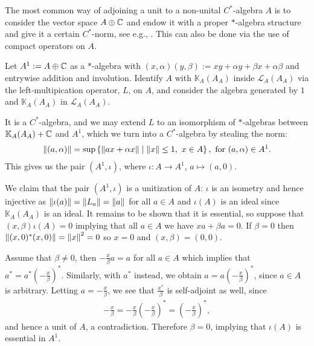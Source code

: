 The most common way of adjoining a unit to a non-unital $C^*$-algebra $A$ is to consider the vector space $A\oplus \mathbb{C}$ and endow it with a proper $*$-algebra structure and give it a certain $C^*$-norm, see e.g., \cite[Theorem 15.1]{zhu}. This can also be done via the use of compact operators on $A$.
\begin{example}
	Let $A^1 := A \oplus \mathbb{C}$ as a $*$-algebra with $(x,\alpha)(y,\beta):=xy+\alpha y + \beta x + \alpha \beta$ and entrywise addition and involution. Identify $A$ with $\mathbb{K}_A(A_A)$ inside $\mathcal{L}_A(A_A)$ via the left-multipication operator, $L$, on $A$, and consider the algebra generated by $1$ and $\mathbb{K}_A(A_A)$ in $\mathcal{L}_A(A_A)$. 
	
	It is a $C^*$-algebra, and we may extend $L$ to an isomorphism of $*$-algebras between $\mathbb{K}_A(A_A)+\mathbb{C}$ and $A^1$, which we turn into a $C^*$-algebra by stealing the norm:
	\begin{align*}
		\left\lVert (a,\alpha)\right\rVert = \sup\left\{ \left\lVert ax + \alpha x \right\rVert \mid \left\lVert x \right\rVert \leq 1, \ x \in A \right\}, \text{ for } (a,\alpha) \in A^1.
	\end{align*}
	This gives us the pair $(A^1,\iota)$, where $\iota \colon A \to A^1$, $a \mapsto (a,0)$.
	
	We claim that the pair $(A^1,\iota)$ is a unitization of $A$: $\iota$ is an isometry and hence injective as $\left\lVert \iota(a)\right\rVert = \left\lVert L_a \right\rVert = \left\lVert a \right\rVert$ for all $a \in A$ and $\iota(A)$ is an ideal since $\mathbb{K}_{A}(A_A)$ is an ideal. It remains to be shown that it is essential, so suppose that $(x,\beta) \iota(A)=0$ implying that all $a \in A$ we have $xa+\beta a = 0$. If $\beta = 0$ then $\left\lVert(x,0)^*(x,0)\right\rVert = \left\lVert x\right\rVert^2 = 0$ so $x = 0$ and $(x,\beta)=(0,0)$.
	
	Assume that $\beta \neq 0$, then $-\frac{x}{\beta}a = a$ for all $ a \in A$ which implies that $a^* = a^* \left( - \frac{x}{\beta}\right)^*$. Similarly, with $a^*$ instead, we obtain $a = a\left(-\frac{x}{\beta}\right)^*$, since $a \in A$ is arbitrary. Letting $a = -\frac{x}{\beta}$, we see that $\frac{x^*}{\beta}$ is self-adjoint as well, since
	\begin{align*}
		-\frac{x}{\beta} = -\frac{x}{\beta} \left(-\frac{x}{\beta}\right)^* = \left(-\frac{x}{\beta}\right)^*,
	\end{align*}
	and hence a unit of $A$, a contradiction. Therefore $\beta = 0$, implying that $\iota(A)$ is essential in $A^1$.
\end{example}

